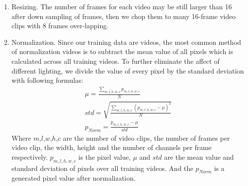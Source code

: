 \begin{enumerate}
	\item Resizing. The number of frames for each video may be still larger than 16 after down sampling of frames, then we chop them to many 16-frame video clips with 8 frames over-lapping.
	\label{normalization}
	\item Normalization. Since our training data are videos, the most common method of normalization videos is to subtract the mean value of all pixels which is calculated across all training videos. To further eliminate the affect of different lighting, we divide the value of every pixel by the standard deviation with following formulas: 
	\begin{eqnarray}
		\mu = \frac{\sum_{m,l,h,w,c}p_{m,l,h,w,c}}{N} \\
		std = \sqrt{\frac{\sum_{m,l,h,w,c}(p_{m,l,h,w,c}-\mu)^2}{N}} \\
		p_{Norm} = \frac{p_{m,l,h,w,c} - \mu}{std}
	\end{eqnarray} 
	Where \(m\),\(l\),\(w\),\(h\),\(c\) are the number of video clips, the number of frames per video clip, the width, height and the number of channels per frame respectively.  \(p_{m,l,h,w,c}\) is the pixel value, \(\mu\) and \(std\) are the mean value and standard deviation of pixels over all training videos. And the \(p_{Norm}\) is a generated pixel value after normalization. 
\end{enumerate} 

